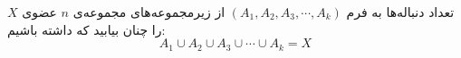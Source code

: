 \EXERCISE
تعداد دنباله‌ها به فرم
$(A_1, A_2, A_3, \cdots, A_k)$
از زیرمجموعه‌های مجموعه‌ی
$n$
عضوی
$X$
را چنان بیابید که داشته باشیم:
$$A_1 \cup A_2 \cup A_3 \cup \cdots \cup A_k = X$$